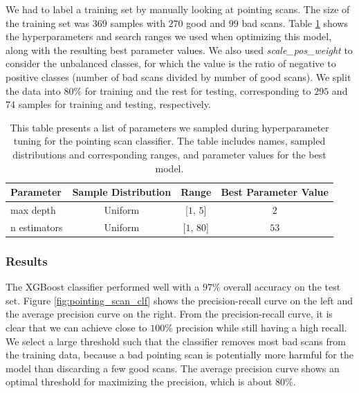 We had to label a training set by manually looking at pointing scans.
The size of the training set was $369$ samples with $270$ good and $99$ bad scans.
Table \ref{tab:xgb_hyperparameters_clf} shows the hyperparameters and search ranges we used when optimizing this model, along with the resulting best parameter values.
We also used \textit{scale\_pos\_weight} to consider the unbalanced classes, for which the value is the ratio of negative to positive classes (number of bad scans divided by number of good scans).
We split the data into $80\%$ for training and the rest for testing, corresponding to $295$ and $74$ samples for training and testing, respectively.

\begin{table}[H]
    \centering
    \caption[Hyperparemter search space XGBoost pointing scan classifier]{This table presents a list of parameters we sampled during hyperparameter tuning for the pointing scan classifier.
    The table includes names, sampled distributions and corresponding ranges, and parameter values for the best model.}
    \begin{tabular}{lccc}
        \toprule
        Parameter & Sample Distribution & Range & Best Parameter Value\\ \hline
        max depth & Uniform & [$1$, $5$] & $2$\\ 
        n estimators & Uniform & [$1$, $80$] & $53$\\ 
        \bottomrule
    \end{tabular}
    \label{tab:xgb_hyperparameters_clf}
\end{table}

\subsubsection{Results}
The XGBoost classifier performed well with a $97\%$ overall accuracy on the test set.
Figure \ref{fig:pointing_scan_clf} shows the precision-recall curve on the left and the average precision curve on the right.
From the precision-recall curve, it is clear that we can achieve close to $100\%$ precision while still having a high recall.
We select a large threshold such that the classifier removes most bad scans from the training data,
because a bad pointing scan is potentially more harmful for the model than discarding a few good scans.
The average precision curve shows an optimal threshold for maximizing the precision, which is about $80\%$.\\

